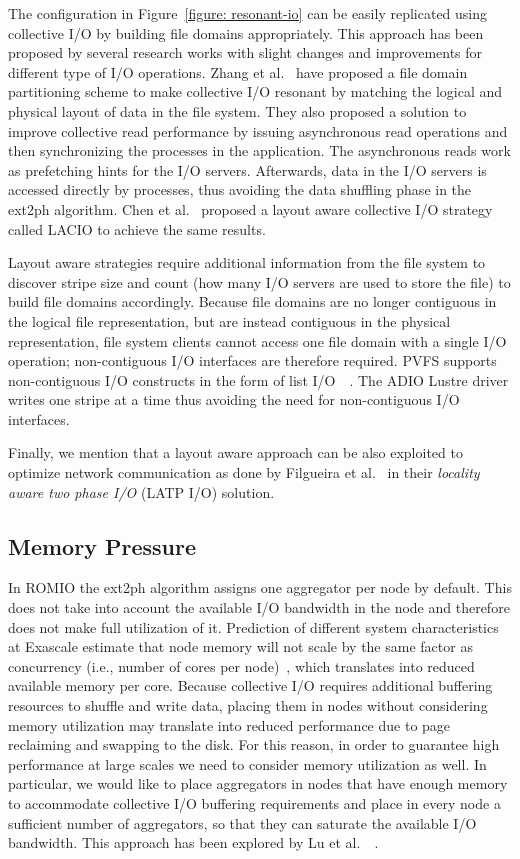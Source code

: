 The configuration in Figure~\ref{figure: resonant-io} can be easily replicated using collective I/O by building file domains appropriately. This approach has been proposed by several research works
with slight changes and improvements for different type of I/O operations. Zhang et al.~\cite{Zhang2009} have proposed a file domain partitioning scheme to make collective I/O resonant by matching
the logical and physical layout of data in the file system. They also proposed a solution to improve collective read performance by issuing asynchronous read operations and then synchronizing the 
processes in the application. The asynchronous reads work as prefetching hints for the I/O servers. Afterwards, data in the I/O servers is accessed directly by processes, thus avoiding the data 
shuffling phase in the ext2ph algorithm. Chen et al.~\cite{Chen2011} proposed a layout aware collective I/O strategy called LACIO to achieve the same results.

Layout aware strategies require additional information from the file system to discover stripe size and count (how many I/O servers are used to store the file) to build file domains accordingly. 
Because file domains are no longer contiguous in the logical file representation, but are instead contiguous in the physical representation, file system clients cannot access one file domain with a 
single I/O operation; non-contiguous I/O interfaces are therefore required. PVFS supports non-contiguous I/O constructs in the form of list I/O~\cite{Ching2002}~\cite{Ching2003}. The ADIO Lustre 
driver writes one stripe at a time thus avoiding the need for non-contiguous I/O interfaces.

Finally, we mention that a layout aware approach can be also exploited to optimize network communication as done by Filgueira et al.~\cite{Filgueira2008} in their \textit{locality aware two phase I/O}
(LATP I/O) solution.

\subsection{Memory Pressure}
In ROMIO the ext2ph algorithm assigns one aggregator per node by default. This does not take into account the available I/O bandwidth in the node and therefore does not make full utilization of it.
Prediction of different system characteristics at Exascale estimate that node memory will not scale by the same factor as concurrency (i.e., number of cores per node)~\cite{ASCAC2010}, which translates 
into reduced available memory per core. Because collective I/O requires additional buffering resources to shuffle and write data, placing them in nodes without considering memory utilization may translate
into reduced performance due to page reclaiming and swapping to the disk. For this reason, in order to guarantee high performance at large scales we need to consider memory utilization as well. In particular, 
we would like to place aggregators in nodes that have enough memory to accommodate collective I/O buffering requirements and place in every node a sufficient number of aggregators, so that they can saturate the 
available I/O bandwidth. This approach has been explored by Lu et al.~\cite{Lu2012}~\cite{Lu2013}. 

